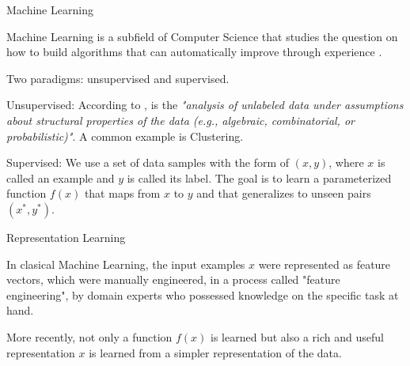 \documentclass[aspectratio=169,xcolor=dvipsnames]{beamer}
\newenvironment{wideitemize}{\itemize\addtolength{\itemsep}{10pt}}{\enditemize}
\begin{document}
\appendix
\begin{frame}{Machine Learning}

\begin{wideitemize}
    \item Machine Learning is a subfield of Computer Science that studies the question on how to build algorithms that can automatically improve through experience \citep{jordan2015machine}.
    \item Two paradigms: unsupervised and supervised.
    \item Unsupervised: According to \citet{jordan2015machine}, is the \textit{"analysis of unlabeled data under assumptions about structural properties of the data (e.g., algebraic, combinatorial, or probabilistic)"}. A common example is Clustering.
    \item Supervised: We use a set of data samples with the form of $(x, y)$, where $x$ is called an example and $y$ is called its label. The goal is to learn a parameterized function $f(x)$ that maps from $x$ to $y$ and that generalizes to unseen pairs $(x^*, y^*)$.
\end{wideitemize}

\end{frame}
\begin{frame}{Representation Learning}

\begin{wideitemize}
    \item In clasical Machine Learning, the input examples $x$ were represented as feature vectors, which were manually engineered, in a process called "feature engineering", by domain experts who possessed knowledge on the specific task at hand.
    \item More recently, not only a function $f(x)$ is learned but also a rich and useful representation $x$ is learned from a simpler representation of the data. 
\end{wideitemize}

\end{frame}
\end{document}
